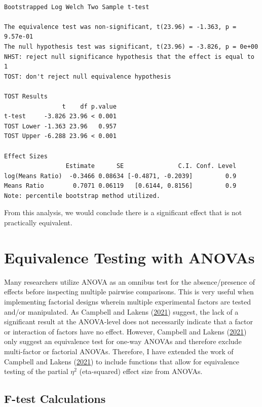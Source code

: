 \documentclass[
]{interact}
\begin{document}
\begin{verbatim}

Bootstrapped Log Welch Two Sample t-test

The equivalence test was non-significant, t(23.96) = -1.363, p = 9.57e-01
The null hypothesis test was significant, t(23.96) = -3.826, p = 0e+00
NHST: reject null significance hypothesis that the effect is equal to 1 
TOST: don't reject null equivalence hypothesis

TOST Results 
                t    df p.value
t-test     -3.826 23.96 < 0.001
TOST Lower -1.363 23.96   0.957
TOST Upper -6.288 23.96 < 0.001

Effect Sizes 
                 Estimate      SE               C.I. Conf. Level
log(Means Ratio)  -0.3466 0.08634 [-0.4871, -0.2039]         0.9
Means Ratio        0.7071 0.06119   [0.6144, 0.8156]         0.9
Note: percentile bootstrap method utilized.
\end{verbatim}

From this analysis, we would conclude there is a significant effect that
is not practically equivalent.

\newpage

\hypertarget{equivalence-testing-with-anovas}{%
\section{Equivalence Testing with
ANOVAs}\label{equivalence-testing-with-anovas}}

Many researchers utilize ANOVA as an omnibus test for the
absence/presence of effects before inspecting multiple pairwise
comparisons. This is very useful when implementing factorial designs
wherein multiple experimental factors are tested and/or manipulated. As
Campbell and Lakens (\protect\hyperlink{ref-Campbell_2021}{2021})
suggest, the lack of a significant result at the ANOVA-level does not
necessarily indicate that a factor or interaction of factors have no
effect. However, Campbell and Lakens
(\protect\hyperlink{ref-Campbell_2021}{2021}) only suggest an
equivalence test for one-way ANOVAs and therefore exclude multi-factor
or factorial ANOVAs. Therefore, I have extended the work of Campbell and
Lakens (\protect\hyperlink{ref-Campbell_2021}{2021}) to include
functions that allow for equivalence testing of the partial \(\eta^2\)
(eta-squared) effect size from ANOVAs.

\hypertarget{f-test-calculations}{%
\subsection{F-test Calculations}\label{f-test-calculations}}
\end{document}
